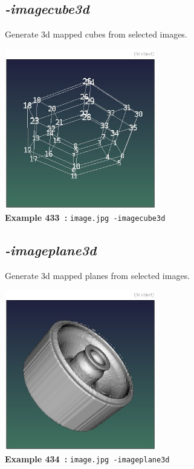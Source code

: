 \documentclass[a4paper,11pt,twoside]{book}
\begin{document}
\subsection{\emph{-imagecube3d} }\vspace*{-0.5em}
Generate 3d mapped cubes from selected images.
\begin{center}\includegraphics[keepaspectratio=true,height=7cm,width=\textwidth]{img/gmic_def433.jpg}\\
{\footnotesize \textbf{Example 433~:} \texttt{image.jpg -imagecube3d}}
\end{center}

\subsection{\emph{-imageplane3d} }\vspace*{-0.5em}
Generate 3d mapped planes from selected images.
\begin{center}\includegraphics[keepaspectratio=true,height=7cm,width=\textwidth]{img/gmic_def434.jpg}\\
{\footnotesize \textbf{Example 434~:} \texttt{image.jpg -imageplane3d}}
\end{center}
\end{document}
